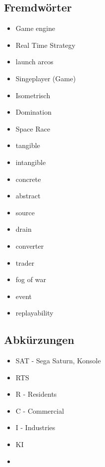\subsection*{Fremdwörter}
\begin{itemize}
    \item Game engine
    \item Real Time Strategy
    \item launch arcos
    \item Singeplayer (Game)
    \item Isometrisch
    \item Domination
    \item Space Race
    \item tangible
    \item intangible
    \item concrete
    \item abstract
    \item source
    \item drain
    \item converter
    \item trader
    \item fog of war
    \item event
    \item replayability
\end{itemize}

\subsection*{Abkürzungen}
\begin{itemize}
    \item SAT - Sega Saturn, Konsole
    \item RTS
    \item R - Residents
    \item C - Commercial
    \item I - Industries
    \item KI
    \item 
\end{itemize}